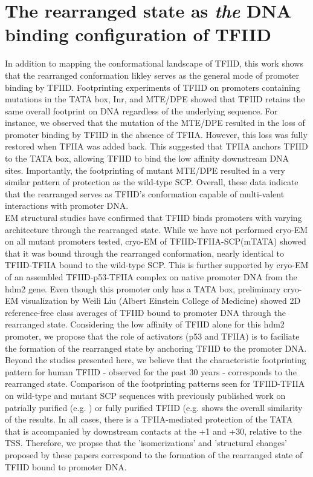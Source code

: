 \section{The rearranged state as \emph{the} DNA binding configuration of TFIID}

In addition to mapping the conformational landscape of TFIID, this work shows that the rearranged conformation likley serves as the general mode of promoter binding by TFIID. Footprinting experiments of TFIID on promoters containing mutations in the TATA box, Inr, and MTE/DPE showed that TFIID retains the same overall footprint on DNA regardless of the underlying sequence. For instance, we observed that the mutation of the MTE/DPE resulted in the loss of promoter binding by TFIID in the absence of TFIIA. However, this loss was fully restored when TFIIA was added back. This suggested that TFIIA anchors TFIID to the TATA box, allowing TFIID to bind the low affinity downstream DNA sites. Importantly, the footprinting of mutant MTE/DPE resulted in a very similar pattern of protection as the wild-type SCP. Overall, these data indicate that the rearranged serves as TFIID's conformation capable of multi-valent interactions with promoter DNA.\\
\indent EM structural studies have confirmed that TFIID binds promoters with varying architecture through the rearranged state. While we have not performed cryo-EM on all mutant promoters tested, cryo-EM of TFIID-TFIIA-SCP(mTATA) showed that it was bound through the rearranged conformation, nearly identical to TFIID-TFIIA bound to the wild-type SCP. This is further supported by cryo-EM of an assembled TFIID-p53-TFIIA complex on native promoter DNA from the hdm2 gene. Even though this promoter only has a TATA box, preliminary cryo-EM visualization by Weili Liu (Albert Einstein College of Medicine) showed 2D reference-free class averages of TFIID bound to promoter DNA through the rearranged state. Considering the low affinity of TFIID alone for this hdm2 promoter, we propose that the role of activators (p53 and TFIIA) is to faciliate the formation of the rearranged state by anchoring TFIID to the promoter DNA. \\    
\indent Beyond the studies presented here, we believe that the characteristic footprinting pattern for human TFIID - observed for the past 30 years - corresponds to the rearranged state. Comparison of the footprinting patterns seen for TFIID-TFIIA on wild-type and mutant SCP sequences with previously published work on patrially purified (e.g. \cite{Sawadogo_3840,Va_3783}) or fully purified TFIID (e.g. \cite{Burke_3081,Chi_3023,Oelgeschlager_2880,Yakovchuk_306} shows the overall similarity of the results. In all cases, there is a TFIIA-mediated protection of the TATA that is accompanied by downstream contacts at the +1 and +30, relative to the TSS. Therefore, we propse that the 'isomerizations' and 'structural changes' proposed by these papers correspond to the formation of the rearranged state of TFIID bound to promoter DNA. \\
